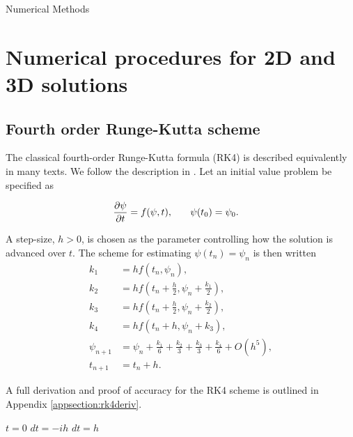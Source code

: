 \begin{chapter}{\label{cha:numerics}Numerical Methods}
\section{\label{section:RK} Numerical procedures for 2D and 3D solutions}
	\subsection{\label{section:RK4} Fourth order Runge-Kutta scheme}
	The classical fourth-order Runge-Kutta formula (RK4) is described equivalently in many texts. We follow the description in \cite{NumericalRecipes}. Let an initial value problem be specified as
	
	\begin{align*}
		\frac{\partial \psi}{\partial t} &= f(\psi,t),\hspace{0.25in}\psi(t_0) = \psi_0.
	\end{align*}

A step-size, $h>0$, is chosen as the parameter controlling how the solution is advanced over $t$. The scheme for estimating $\psi(t_n)= \psi_n$ is then written
\begin{equation}
\begin{split}
		k_1 &= hf(t_n,\psi_n),\\
		k_2 &= hf(t_n+\frac{h}{2},\psi_n+\frac{k_1}{2}),\\
		k_3 &= hf(t_n+\frac{h}{2},\psi_n+\frac{k_2}{2}),\\
		k_4 &= hf(t_n+h,\psi_n+k_3),\\
		\psi_{n+1} &= \psi_n + \frac{k_1}{6}+ \frac{k_2}{3}+ \frac{k_3}{3} + \frac{k_4}{6} + O(h^5),\\
		t_{n+1}  &= t_n + h.
		\label{eq:rk4}
\end{split}
\end{equation}


	A full derivation and proof of accuracy for the RK4 scheme is outlined in Appendix \ref{appsection:rk4deriv}.
	\begin{algorithm}[H]
		\BlankLine
		$t = 0$\;
		$dt = -ih$\;
		$dt = h$\;
\end{algorithm}
\end{chapter}
